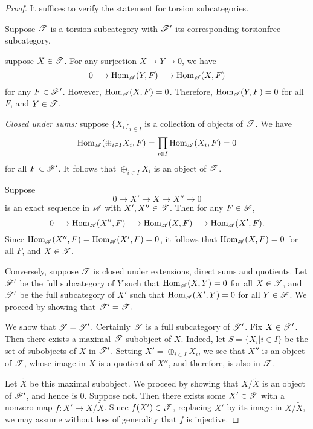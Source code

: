 \begin{proof}
It suffices to verify the statement for torsion subcategories.

Suppose $\mathscr{T}$ is a torsion subcategory with $\mathscr{F}'$ its 
corresponding torsionfree subcategory. 

 suppose $X \in \mathscr{T}$. For any 
surjection $X \to Y \to 0$, we have 
\[
0 \longrightarrow \mathrm{Hom}_{\mathscr{A}}(Y, F) \longrightarrow \mathrm{Hom}_{\mathscr{A}}(X, F)
\]
for any $F \in \mathscr{F}'$. However, $\mathrm{Hom}_{\mathscr{A}}(X, F) = 0$.
Therefore, $\mathrm{Hom}_{\mathscr{A}}(Y, F) = 0$ for all $F$, and $Y \in
\mathscr{T}$.

\emph{Closed under sums:} suppose $\{X_i\}_{i \in I}$ is a 
collection of objects of $\mathscr{T}$. We have
\[
\mathrm{Hom}_{\mathscr{A}}( \oplus_{i \in I} X_i, F) = \prod_{i \in I}
\mathrm{Hom}_{\mathscr{A}}( X_i, F) = 0
\]
for all $F \in \mathscr{F}'$. It follows that $\oplus_{i \in I} X_i$
is an object of $\mathscr{T}$.

 Suppose 
\[
0 \to X' \to X \to X'' \to 0
\]
is an exact sequence in $\mathscr{A}$ with $X', X'' \in \mathscr{T}$.
Then for any $F \in \mathscr{F}$, 
\[
0 \longrightarrow \mathrm{Hom}_{\mathscr{A}}(X'', F) \longrightarrow \mathrm{Hom}_{\mathscr{A}}(X, F) \longrightarrow
\mathrm{Hom}_{\mathscr{A}}(X', F).
\]
Since $\mathrm{Hom}_{\mathscr{A}}(X'', F) = \mathrm{Hom}_{\mathscr{A}}(X', F) = 0$,
it follows that $\mathrm{Hom}_{\mathscr{A}}(X, F) = 0$ for all $F$, and
$X \in \mathscr{T}$.

Conversely, suppose $\mathscr{T}$ is closed under extensions, direct 
sums and quotients. Let $\mathscr{F}'$ be the full subcategory of $Y$ 
such that $\mathrm{Hom}_{\mathscr{A}}(X, Y) = 0$ for all $X \in \mathscr{T}$, and 
$\mathscr{T}'$ be the full subcategory of $X'$ such that 
$\mathrm{Hom}_{\mathscr{A}}(X', Y) = 0$ for all $Y \in \mathscr{F}$. We proceed
by showing that $\mathscr{T'} = \mathscr{T}.$

We show that $\mathscr{T} = \mathscr{T'}$. Certainly $\mathscr{T}$ is a full
subcategory of $\mathscr{T'}$. Fix $X \in \mathscr{T'}$. Then there exists
a maximal $\mathscr{T}$ subobject of $X$. Indeed, let $S = \{X_i| i 
\in I\}$ be the set of subobjects of $X$ in $\mathscr{T'}$. Setting 
$X' = \displaystyle \oplus_{i \in I} X_i$, we see that $X''$ is 
an object of $\mathscr{T}$, whose image in $X$ is a quotient of 
$X''$, and therefore, is also in $\mathscr{T}$. 

Let $\tilde{X}$ be this maximal subobject. We proceed by showing 
that $X/\tilde{X}$ is an object of $\mathscr{F}'$, and hence is 0.
Suppose not. Then there exists some $X' \in \mathscr{T}$ with a 
nonzero map $f: X' \to X/\tilde{X}$. Since $f(X') \in \mathscr{T}$,
replacing $X'$ by its image in $X/\tilde{X}$, we may assume
without loss of generality that $f$ is injective.


\end{proof}
